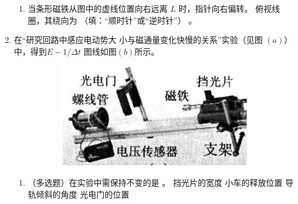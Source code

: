 \begin{enumerate}
\begin{enumerate}
\item 
当条形磁铁从图中的虚线位置向右远离 $ L $ 时，指针向右偏转。
俯视线圈，其绕向为 \underlinegap （填：“顺时针”或“逆时针”）
。

\end{enumerate}
\begin{figure}[h!]
\centering

\end{figure}




\item 
{}
在“研究回路中感应电动势大
小与磁通量变化快慢的关系”实验（见图
$ (a) $）中，得到$ E-1/ \Delta t $ 图线如图$ (b) $所示。
\begin{figure}[h!]
\centering
\begin{subfigure}{0.4\linewidth}
\centering
\includegraphics[width=0.7\linewidth]{picture/screenshot065}
\caption{}\label{}
\end{subfigure}
\begin{subfigure}{0.4\linewidth}
\centering
 
\caption{}\label{}
\end{subfigure}

\end{figure}


\begin{enumerate}
\item
（多选题）在实验中需保持不变的是 \underlinegap 。
\fourchoices
{挡光片的宽度}
{小车的释放位置}
{导轨倾斜的角度}
{光电门的位置}



\end{enumerate}
\end{enumerate}
